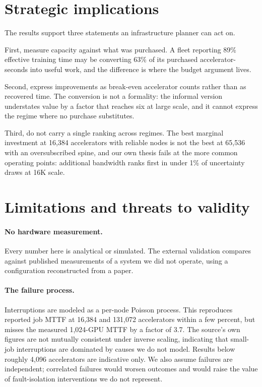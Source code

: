 \documentclass[11pt]{article}
\begin{document}
\section{Strategic implications}

The results support three statements an infrastructure planner can act on.

First, measure capacity against what was purchased. A fleet reporting 89\%
effective training time may be converting 63\% of its purchased
accelerator-seconds into useful work, and the difference is where the budget
argument lives.

Second, express improvements as break-even accelerator counts rather than as
recovered time. The conversion is not a formality: the informal version
understates value by a factor that reaches six at large scale, and it cannot
express the regime where no purchase substitutes.

Third, do not carry a single ranking across regimes. The best marginal
investment at 16{,}384 accelerators with reliable nodes is not the best at
65{,}536 with an oversubscribed spine, and our own thesis fails at the more
common operating points: additional bandwidth ranks first in under 1\% of
uncertainty draws at 16K scale.

\section{Limitations and threats to validity}

\paragraph{No hardware measurement.} Every number here is analytical or
simulated. The external validation compares against published measurements of a
system we did not operate, using a configuration reconstructed from a paper.

\paragraph{The failure process.} Interruptions are modeled as a per-node Poisson
process. This reproduces reported job MTTF at 16{,}384 and 131{,}072
accelerators within a few percent, but misses the measured 1{,}024-GPU MTTF by a
factor of 3.7. The source's own figures are not mutually consistent under
inverse scaling, indicating that small-job interruptions are dominated by causes
we do not model. Results below roughly 4{,}096 accelerators are indicative only.
We also assume failures are independent; correlated failures would worsen
outcomes and would raise the value of fault-isolation interventions we do not
represent.
\end{document}
